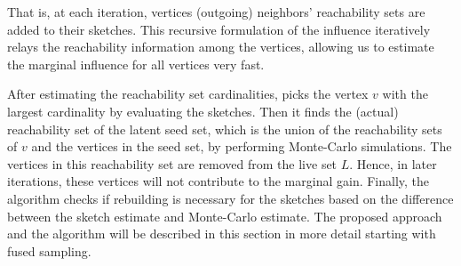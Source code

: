 That is, at each iteration, vertices (outgoing) neighbors' reachability sets are added to their sketches.
This recursive formulation of the influence iteratively relays the reachability information among the vertices, allowing us to estimate the marginal influence for all vertices very fast.


After estimating the reachability set cardinalities, \acro picks the vertex $v$ with the largest cardinality by evaluating the sketches. Then it finds the (actual) reachability set of the latent seed set, which is the union of the reachability sets of $v$ and the vertices in the seed set, by performing Monte-Carlo simulations. The vertices in this reachability set are removed from the live set $L$. %
Hence, in later iterations, these vertices will not contribute to the marginal gain. Finally, the algorithm checks if rebuilding is necessary for the sketches based on the difference between the sketch estimate and Monte-Carlo estimate. The proposed approach and the algorithm will be described in this section in more detail starting with fused sampling.%

